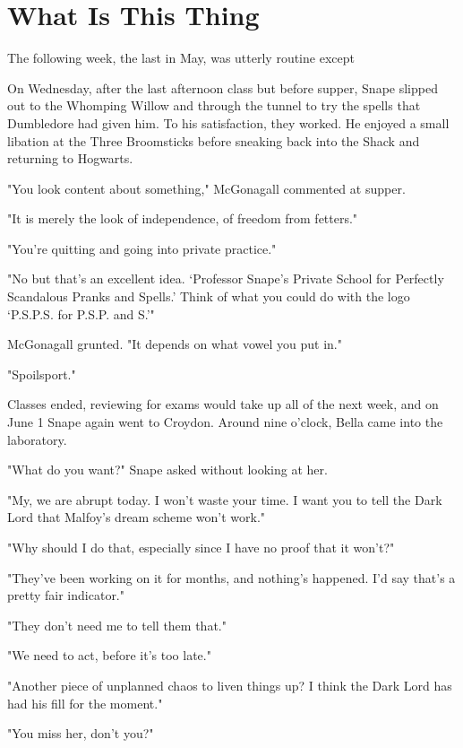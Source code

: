 
\chapter{What Is This Thing{\el}}

The following week, the last in May, was utterly routine except{\el}

On Wednesday, after the last afternoon class but before supper, Snape slipped out to the Whomping Willow and through the tunnel to try the spells that Dumbledore had given him. To his satisfaction, they worked. He enjoyed a small libation at the Three Broomsticks before sneaking back into the Shack and returning to Hogwarts.

"You look content about something," McGonagall commented at supper.

"It is merely the look of independence, of freedom from fetters."

"You're quitting and going into private practice."

"No{\el} but that's an excellent idea. `Professor Snape's Private School for Perfectly Scandalous Pranks and Spells.' Think of what you could do with the logo `P.S.P.S. for P.S.P. and S.'"

McGonagall grunted. "It depends on what vowel you put in."

"Spoilsport."

Classes ended, reviewing for exams would take up all of the next week, and on June 1 Snape again went to Croydon. Around nine o'clock, Bella came into the laboratory.

"What do you want?" Snape asked without looking at her.

"My, we are abrupt today. I won't waste your time. I want you to tell the Dark Lord that Malfoy's dream scheme won't work."

"Why should I do that, especially since I have no proof that it won't?"

"They've been working on it for months, and nothing's happened. I'd say that's a pretty fair indicator."

"They don't need me to tell them that."

"We need to act, before it's too late."

"Another piece of unplanned chaos to liven things up? I think the Dark Lord has had his fill for the moment."

"You miss her, don't you?"

